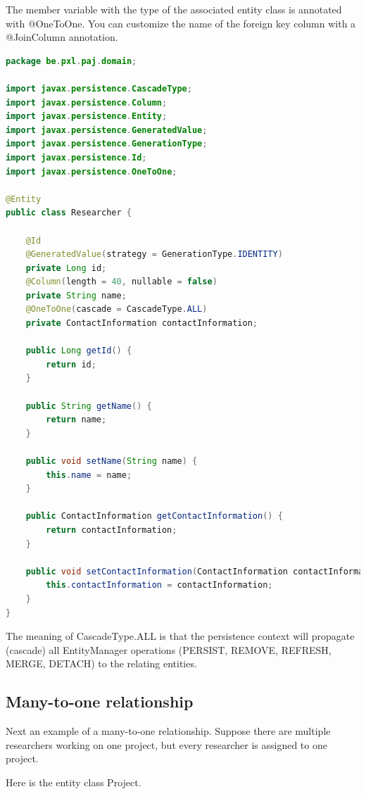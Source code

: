 The member variable with the type of the associated entity class is annotated with @OneToOne. You can customize the name of the foreign key column with a @JoinColumn annotation.

\begin{lstlisting}[frame=single, language=java]
package be.pxl.paj.domain;

import javax.persistence.CascadeType;
import javax.persistence.Column;
import javax.persistence.Entity;
import javax.persistence.GeneratedValue;
import javax.persistence.GenerationType;
import javax.persistence.Id;
import javax.persistence.OneToOne;

@Entity
public class Researcher {

	@Id
	@GeneratedValue(strategy = GenerationType.IDENTITY)
	private Long id;
	@Column(length = 40, nullable = false)
	private String name;
	@OneToOne(cascade = CascadeType.ALL)
	private ContactInformation contactInformation;

	public Long getId() {
		return id;
	}

	public String getName() {
		return name;
	}

	public void setName(String name) {
		this.name = name;
	}

	public ContactInformation getContactInformation() {
		return contactInformation;
	}

	public void setContactInformation(ContactInformation contactInformation) {
		this.contactInformation = contactInformation;
	}
}
\end{lstlisting}

The meaning of CascadeType.ALL is that the persistence context will propagate (cascade) all EntityManager operations (PERSIST, REMOVE, REFRESH, MERGE, DETACH) to the relating entities.

\subsection{Many-to-one relationship}

Next an example of a many-to-one relationship.  
Suppose there are multiple researchers working on one project, but every researcher is assigned to one project. 

Here is the entity class Project.

